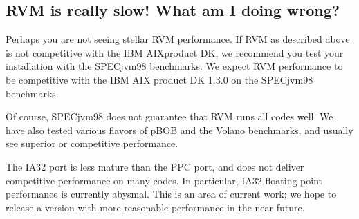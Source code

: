 \subsection{RVM is really slow! What am I doing wrong?}


Perhaps you are not seeing stellar RVM performance.  If RVM as described
above is not competitive with the IBM AIX\AIXTMFootnote product DK,
we recommend 
you test your installation with the SPECjvm98 benchmarks.
We expect RVM performance to be competitive with the 
IBM AIX product DK 1.3.0 on the SPECjvm98 benchmarks. 

Of course, SPECjvm98 does not guarantee that RVM runs all codes
well.  We have also tested various flavors of pBOB and the Volano
benchmarks, and usually see superior or competitive performance.

The IA32 port is less mature than the PPC port, and does not deliver
competitive performance on many codes.  In particular, IA32 floating-point
performance is currently abysmal.  This is an area of current work; we
hope to release a version with more reasonable performance in the near
future. 

